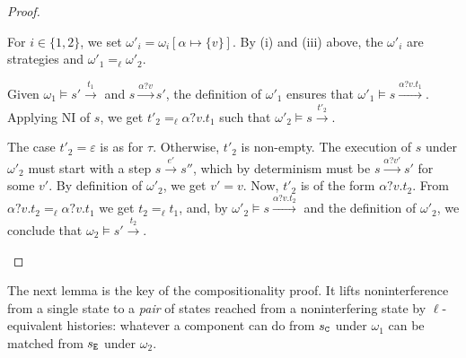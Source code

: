 \documentclass[preprint,5p,twocolumn]{elsarticle}
\begin{document}
\begin{proof}
\begin{itemize}
    For $i \in \{1,2\}$, we set $\omega'_i = \omega_i[\alpha \mapsto \{v\}]$. By (i) and (iii)
    above, the $\omega'_i$ are strategies and $\omega'_1 =_\ell \omega'_2$.

    Given $\omega_1 \vDash s' \xrightarrow{t_1}$ and $s \xrightarrow{\alpha?v} s'$, the definition of $\omega'_1$
    ensures that $\omega'_1 \vDash s \xrightarrow{\alpha?v.t_1}$.  
    Applying NI of $s$, we get $t'_2 =_\ell \alpha?v.t_1$ such that $\omega'_2 \vDash s \xrightarrow{t'_2}$.
    
    The case $t'_2 = \varepsilon$ is as for $\tau$. 
    Otherwise, $t'_2$ is non-empty. The execution
    of $s$ under $\omega'_2$ must start with a step $s \xrightarrow{e'} s''$, which by determinism must
    be $s \xrightarrow{\alpha?v'} s'$ for some $v'$. By definition of $\omega'_2$, we get $v'=v$.
    Now, $t'_2$ is of the form $\alpha ? v.t_2$. From $\alpha?v.t_2 =_\ell \alpha?v.t_1$
    we get $t_2 =_\ell t_1$, and, by $\omega'_2 \vDash s \xrightarrow{\alpha?v.t_2}$ and the definition
    of $\omega'_2$, we conclude that $\omega_2 \vDash s' \xrightarrow{t_2}$.
  \end{itemize}
  
\end{proof}

The next lemma is the key of the compositionality proof. It lifts noninterference from a
single state to a \emph{pair} of states reached from a noninterfering state by $\ell$-equivalent
histories: whatever a component can do from $s_{\mathtt{C}}$ under $\omega_1$ can be matched from $s_{\mathtt{E}}$ under
$\omega_2$.
\end{document}
